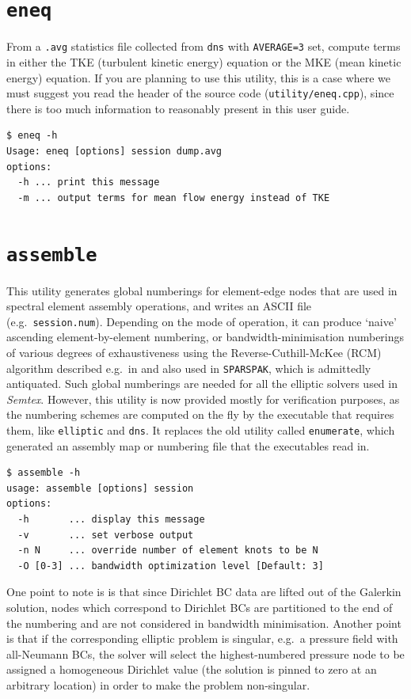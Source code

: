 \documentclass[11pt]{report}
\newcommand{\Semtex}{\emph{Semtex}} \newcommand{\Dog}{\emph{Dog}}
\newcommand{\eg}{e.g.\ } \newcommand{\CC}{\mathrm{c.c.}}
\begin{document}
\section{\texttt{eneq}}
\label{sec.eneq}

From a \verb|.avg| statistics file collected from \verb|dns| with
\verb|AVERAGE=3| set, compute terms in either the TKE (turbulent
kinetic energy) equation or the MKE (mean kinetic energy) equation.
If you are planning to use this utility, this is a case where we must
suggest you read the header of the source code
(\verb|utility/eneq.cpp|), since there is too much information to
reasonably present in this user guide.
{\small
\begin{verbatim}
$ eneq -h
Usage: eneq [options] session dump.avg
options:
  -h ... print this message
  -m ... output terms for mean flow energy instead of TKE
\end{verbatim}
}
%

\section{\texttt{assemble}}
\label{sec.assemble}

This utility generates global numberings for element-edge nodes that
are used in spectral element assembly operations, and writes an ASCII
file (\eg \verb|session.num|). Depending on the mode of operation, it
can produce `naive' ascending element-by-element numbering, or
bandwidth-minimisation numberings of various degrees of exhaustiveness
using the Reverse-Cuthill-McKee (RCM) algorithm described \eg in
\citet{george81} and also used in \verb|SPARSPAK|, which is admittedly
antiquated.  Such global numberings are needed for all the elliptic
solvers used in \Semtex.  However, this utility is now provided mostly
for verification purposes, as the numbering schemes are computed on
the fly by the executable that requires them, like \verb+elliptic+ and
\verb+dns+.  It replaces the old utility called \verb+enumerate+,
which generated an assembly map or numbering file that the executables
read in.
%
{\small
\begin{verbatim}
$ assemble -h
usage: assemble [options] session
options:
  -h       ... display this message
  -v       ... set verbose output
  -n N     ... override number of element knots to be N
  -O [0-3] ... bandwidth optimization level [Default: 3]
\end{verbatim}
}
%
One point to note is is that since Dirichlet BC data are lifted out of
the Galerkin solution, nodes which correspond to Dirichlet BCs are
partitioned to the end of the numbering and are not considered in
bandwidth minimisation.  Another point is that if the corresponding
elliptic problem is singular, \eg a pressure field with all-Neumann
BCs, the solver will select the highest-numbered pressure node to be
assigned a homogeneous Dirichlet value (\ie the solution is pinned to
zero at an arbitrary location) in order to make the problem non-singular.
\end{document}
